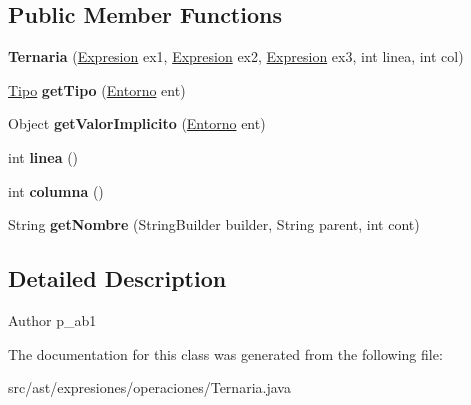 \subsection*{Public Member Functions}
\begin{DoxyCompactItemize}
\item 
\mbox{\label{classast_1_1expresiones_1_1operaciones_1_1_ternaria_a64b6ad4de626de178cb6755ecade9519}} 
{\bfseries Ternaria} (\mbox{\hyperlink{interfaceast_1_1_expresion}{Expresion}} ex1, \mbox{\hyperlink{interfaceast_1_1_expresion}{Expresion}} ex2, \mbox{\hyperlink{interfaceast_1_1_expresion}{Expresion}} ex3, int linea, int col)
\item 
\mbox{\label{classast_1_1expresiones_1_1operaciones_1_1_ternaria_a460aa20abeeca05f8418650686bff361}} 
\mbox{\hyperlink{classentorno_1_1_tipo}{Tipo}} {\bfseries get\+Tipo} (\mbox{\hyperlink{classentorno_1_1_entorno}{Entorno}} ent)
\item 
\mbox{\label{classast_1_1expresiones_1_1operaciones_1_1_ternaria_a07b689bcc58b97b837291569a740cc05}} 
Object {\bfseries get\+Valor\+Implicito} (\mbox{\hyperlink{classentorno_1_1_entorno}{Entorno}} ent)
\item 
\mbox{\label{classast_1_1expresiones_1_1operaciones_1_1_ternaria_a8dc5b11a40414296a32a550e987029f2}} 
int {\bfseries linea} ()
\item 
\mbox{\label{classast_1_1expresiones_1_1operaciones_1_1_ternaria_adcaf20cf1bda131dad5aef6c47a0da6b}} 
int {\bfseries columna} ()
\item 
\mbox{\label{classast_1_1expresiones_1_1operaciones_1_1_ternaria_a79bd4eed4dd4752fcdc2397861129caa}} 
String {\bfseries get\+Nombre} (String\+Builder builder, String parent, int cont)
\end{DoxyCompactItemize}


\subsection{Detailed Description}
\begin{DoxyAuthor}{Author}
p\+\_\+ab1 
\end{DoxyAuthor}


The documentation for this class was generated from the following file\+:\begin{DoxyCompactItemize}
\item 
src/ast/expresiones/operaciones/Ternaria.\+java\end{DoxyCompactItemize}
